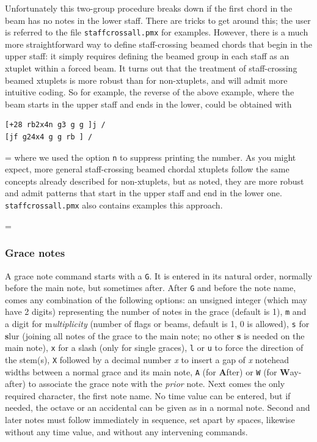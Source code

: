 \documentclass[11pt]{article}
\def\newfrom{2.59}  %
\def\NEW#1{\ifdim#1 pt<\newfrom pt\else%
\marginpar{\fbox{#1}}\fi}
\begin{document}
Unfortunately this two-group procedure breaks down if the first chord in the beam has no
notes in the lower staff. There are tricks to get around this; the user is referred to
the file {\tt staffcrossall.pmx} for examples. However, there is a much more 
straightforward way to define 
staff-crossing beamed chords that begin in the upper staff: it simply requires defining 
the beamed group in each staff as an xtuplet within a forced beam. It turns out that 
the treatment of 
staff-crossing beamed xtuplets is more robust than for non-xtuplets, and will admit
more intuitive coding. So for example, the reverse of the above example, where
the beam starts in the upper staff and ends in the lower, could be obtained with
\begin{verbatim}
[+28 rb2x4n g3 g g ]j /
[jf g24x4 g g rb ] /
\end{verbatim}
\newdimen\psav\psav=\parindent\parindent=0pt where we used the option {\tt n} to  
suppress printing the number. As you might expect, more general staff-crossing 
beamed chordal xtuplets follow the same concepts already described for non-xtuplets,
but as noted, they are more robust and admit patterns that start in the upper staff
and end in the lower one. {\tt staffcrossall.pmx} also contains examples this
approach.
 
\parindent=\psav

\subsubsection{Grace notes}\label{graces}

	A grace note command starts with a {\tt G}.  It is entered in its natural
order, normally before the main note, but sometimes after.  After {\tt G} and
before the note name, comes any 
combination of the following options: an unsigned integer (which may have 2 digits)
representing the number of 
notes in the grace (default is 1), {\tt m} and a digit for 
{\bfi m}{\it ultiplicity} 
(number of flags or beams, default is 1, 0 is allowed), 
{\tt s} for {\bf s}lur (joining all notes of the 
grace to the main note; no other {\bf s} is needed on the main note), 
{\tt x} for a slash (only for single graces), 
{\tt l} or {\tt u} to force the direction of the stem(s), 
{\tt X} followed by a decimal number {\it x} to insert a gap of {\it x}
notehead widths between a normal grace and its main note\NEW{2.6},
{\tt A} (for
{\bf A}fter) or {\tt W} (for {\bf W}ay-after) to associate 
the grace note with the {\it prior} note.  Next comes the only 
required character, the 
first note name.  No time value can be entered, but if needed, the 
octave or an accidental can be given as in a normal note.  Second and 
later notes must follow immediately in sequence, set apart by spaces, likewise 
without any time value, and without any intervening commands.
\end{document}
